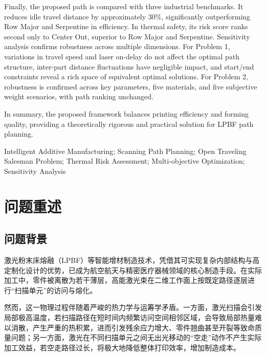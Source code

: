 \documentclass[a4paper, 12pt]{ctexart}
\newcommand{\xiaosi}{\zihao{-4}}
\begin{document}
{Finally, the proposed path is compared with three industrial benchmarks. It reduces idle travel distance by approximately 30\%, significantly outperforming Row Major and Serpentine in efficiency. In thermal safety, its risk score ranks second only to Center Out, superior to Row Major and Serpentine. Sensitivity analysis confirms robustness across multiple dimensions. For Problem 1, variations in travel speed and laser on-delay do not affect the optimal path structure, inter-part distance fluctuations have negligible impact, and start/end constraints reveal a rich space of equivalent optimal solutions. For Problem 2, robustness is confirmed across key parameters, five materials, and five subjective weight scenarios, with path ranking unchanged.

In summary, the proposed framework balances printing efficiency and forming quality, providing a theoretically rigorous and practical solution for LPBF path planning.

}

\vspace{1em}
\noindent{\xiaosi\bfseries Keywords:} {\xiaosi Intelligent Additive Manufacturing; Scanning Path Planning; Open Traveling Salesman Problem; Thermal Risk Assessment; Multi-objective Optimization; Sensitivity Analysis}

\newpage
\tableofcontents
\newpage
\setcounter{page}{1}
\cfoot{\thepage}
\xiaosi\songti %

\newpage

\section{问题重述}

\subsection{问题背景}
激光粉末床熔融（LPBF）等智能增材制造技术，凭借其可实现复杂内部结构与高定制化设计的优势，已成为航空航天与精密医疗器械领域的核心制造手段。在实际加工中，零件被离散为若干薄层，高能激光束在二维工作面上按既定路径逐层进行“扫描单元”的访问与熔化。

然而，这一物理过程伴随着严峻的热力学与运筹学矛盾。一方面，激光扫描会引发局部极高温度，若扫描路径在短时间内频繁访问空间相邻区域，会导致局部热量难以消散，产生严重的热积累，进而引发残余应力增大、零件翘曲甚至开裂等致命质量问题；另一方面，激光在不同扫描单元之间无出光移动的“空走”动作不产生实际加工效益，若空走路径过长，将极大地降低整体打印效率，增加制造成本。
\end{document}
